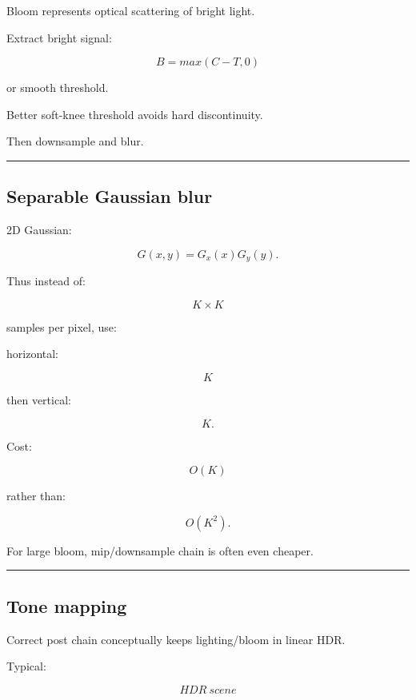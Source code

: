 Bloom represents optical scattering of bright light.

Extract bright signal:

\[
B=
max(
C-T,
0
)
\]

or smooth threshold.

Better soft-knee threshold avoids hard discontinuity.

Then downsample and blur.

\begin{center}\rule{0.5\linewidth}{0.5pt}\end{center}

\subsection{Separable Gaussian blur}\label{04-visual-computing-ii-ch040-separable-gaussian-blur}

\hypertarget{04-visual-computing-ii-ch040-separable-gaussian-blur}{}

2D Gaussian:

\[
G(x,y)
=
G_x(x)G_y(y).
\]

Thus instead of:

\[
K\times K
\]

samples per pixel, use:

horizontal:

\[
K
\]

then vertical:

\[
K.
\]

Cost:

\[
O(K)
\]

rather than:

\[
O(K^2).
\]

For large bloom, mip/downsample chain is often even cheaper.

\begin{center}\rule{0.5\linewidth}{0.5pt}\end{center}

\subsection{Tone mapping}\label{04-visual-computing-ii-ch040-tone-mapping}

\hypertarget{04-visual-computing-ii-ch040-tone-mapping}{}

Correct post chain conceptually keeps lighting/bloom in linear HDR.

Typical:

\[
HDR\ scene
\]

